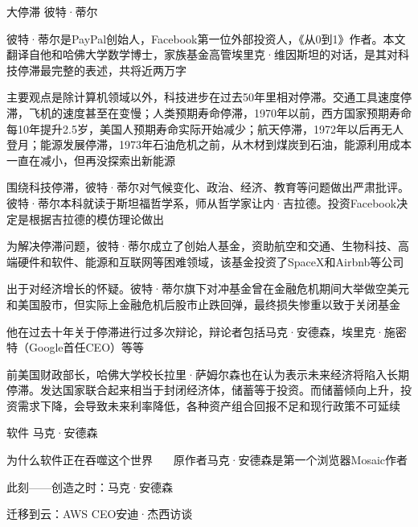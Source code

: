 

\begin{cventries}

  \cventry
  {大停滞} %
  {彼特·蒂尔} %
    {} %
    {} %
    {
      \begin{cvitems} %
        \item {彼特·蒂尔是PayPal创始人，Facebook第一位外部投资人，《从0到1》作者。本文翻译自他和哈佛大学数学博士，家族基金高管埃里克·维因斯坦的对话，是其对科技停滞最完整的表述，共将近两万字}
        \item {主要观点是除计算机领域以外，科技进步在过去50年里相对停滞。交通工具速度停滞，飞机的速度甚至在变慢；人类预期寿命停滞，1970年以前，西方国家预期寿命每10年提升2.5岁，美国人预期寿命实际开始减少；航天停滞，1972年以后再无人登月；能源发展停滞，1973年石油危机之前，从木材到煤炭到石油，能源利用成本一直在减小，但再没探索出新能源}
        \item {围绕科技停滞，彼特·蒂尔对气候变化、政治、经济、教育等问题做出严肃批评。彼特·蒂尔本科就读于斯坦福哲学系，师从哲学家让内·吉拉德。投资Facebook决定是根据吉拉德的模仿理论做出}
        \item {为解决停滞问题，彼特·蒂尔成立了创始人基金，资助航空和交通、生物科技、高端硬件和软件、能源和互联网等困难领域，该基金投资了SpaceX和Airbnb等公司}
        \item {出于对经济增长的怀疑。彼特·蒂尔旗下对冲基金曾在金融危机期间大举做空美元和美国股市，但实际上金融危机后股市止跌回弹，最终损失惨重以致于关闭基金}
        \item {他在过去十年关于停滞进行过多次辩论，辩论者包括马克·安德森，埃里克·施密特（Google首任CEO）等等}
        \item {前美国财政部长，哈佛大学校长拉里·萨姆尔森也在认为表示未来经济将陷入长期停滞。发达国家联合起来相当于封闭经济体，储蓄等于投资。而储蓄倾向上升，投资需求下降，会导致未来利率降低，各种资产组合回报不足和现行政策不可延续}
      \end{cvitems}
    }

    \cventry
    {软件} %
    {马克·安德森} %
    {} %
    {} %
    {
      \begin{cvitems} %
        \item {为什么软件正在吞噬这个世界 \ \ \ 原作者马克·安德森是第一个浏览器Mosaic作者}
        \item {此刻——创造之时：马克·安德森}
        \item {迁移到云：AWS CEO安迪·杰西访谈}
      \end{cvitems}
    }



\end{cventries}
